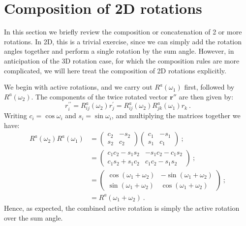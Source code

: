 \section{Composition of 2D rotations}\label{\chabbr:sec:2Dcomposition}
In this section we briefly review the composition or concatenation of 2 or more rotations.  In 2D, this is a trivial exercise, since we can simply add the rotation angles together and perform a single rotation by the sum angle.  However, in anticipation of the 3D rotation case, for which the composition rules are more complicated, we will here treat the composition of 2D rotations explicitly.

We begin with active rotations, and we carry out $R^a(\omega_1)$ first, followed by $R^a(\omega_2)$.  The components of the twice rotated vector $\mathbf{r}''$ are then given by:
\[
	r^{\prime\prime}_i = R^a_{ij}(\omega_2)r^{\prime}_j = R^a_{ij}(\omega_2)R^a_{jk}(\omega_1)r_k\ .
\]
Writing $c_i=\cos\omega_i$ and $s_i=\sin\omega_i$, and multiplying the matrices together we have:
\begin{align*}
	R^a(\omega_2)R^a(\omega_1) & = 
	\left(\begin{array}{cc} c_2 & -s_2\\ s_2 & c_2\end{array}\right)
	\left(\begin{array}{cc} c_1 & -s_1\\ s_1 & c_1\end{array}\right)\ ;\\
	&=
	\left(\begin{array}{cc} c_1c_2-s_1s_2 &
	-s_1c_2 - c_1s_2\\
	c_1s_2+s_1c_2 &
	c_1c_2-s_1s_2\end{array}\right)\ ; \\
	&= 	\left(\begin{array}{cc} \cos(\omega_1+\omega_2) & -\sin(\omega_1+\omega_2)\\ 
	\sin(\omega_1+\omega_2) & \cos(\omega_1+\omega_2)\end{array}\right)\ ;\\
	&= R^a(\omega_1+\omega_2)\ .
\end{align*}
Hence, as expected, the combined active rotation is simply the active rotation over the sum angle.  

